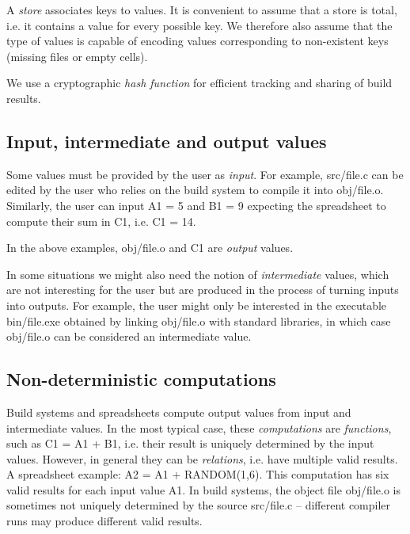 A \emph{store} associates keys to values. It is convenient to assume that a store
is total, i.e. it contains a value for every possible key. We therefore also
assume that the type of values is capable of encoding values corresponding to
non-existent keys (missing files or empty cells).

We use a cryptographic \emph{hash function}  for
efficient tracking and sharing of build results.

\subsection{Input, intermediate and output values}

Some values must be provided by the user as \emph{input}. For example,
\textsf{src/file.c} can be edited by the user who relies on the build system to
compile it into \textsf{obj/file.o}. Similarly, the user can input \textsf{A1 = 5}
and \textsf{B1 = 9} expecting the spreadsheet to compute their sum in \textsf{C1},
i.e. \textsf{C1 = 14}.

In the above examples, \textsf{obj/file.o} and \textsf{C1} are \emph{output} values.

In some situations we might also need the notion of \emph{intermediate} values,
which are not interesting for the user but are produced in the process of turning
inputs into outputs. For example, the user might only be interested in the
executable \textsf{bin/file.exe} obtained by linking \textsf{obj/file.o} with
standard libraries, in which case \textsf{obj/file.o} can be considered an
intermediate value.

\subsection{Non-deterministic computations}

Build systems and spreadsheets compute output values from input and intermediate
values. In the most typical case, these \emph{computations} are \emph{functions},
such as \textsf{C1 = A1 + B1}, i.e. their result is uniquely determined by the
input values. However, in general they can be \emph{relations}, i.e. have
multiple valid results. A spreadsheet example: \textsf{A2 = A1 + RANDOM(1,6)}.
This computation has six valid results for each input value \textsf{A1}. In
build systems, the object file \textsf{obj/file.o} is sometimes not uniquely
determined by the source \textsf{src/file.c} -- different compiler runs may
produce different valid results.

